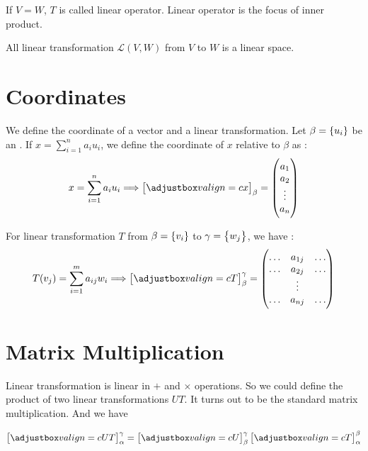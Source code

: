 If $V = W$, $T$ is called linear operator. Linear operator is the focus of inner product.

All linear transformation $\mathcal {L}(V,W)$ from $V$ to $W$ is a linear space.

\section{Coordinates}

We define the coordinate of a vector and a linear transformation. Let $\beta = \set{u_i}$ be an . If $x = \sum_{i=1}^n a_i u_i$, we define the coordinate of $x$ relative to $\beta$ as :
\begin{equation}
    x = \sum_{i=1}^n a_i u_i \Longrightarrow \coordinate{x}_\beta = \begin{pmatrix}
        a_1 \\
        a_2 \\
        \vdots \\
        a_n
    \end{pmatrix}
\end{equation}

For linear transformation $T$ from $\beta = \set{v_i} $ to $\gamma = \set{w_j}$, we have :
\begin{equation}
    T(v_j) = \sum_{i=1}^m a_{ij} w_i \Longrightarrow \coordinate{T}_{\beta}^{\gamma} = \begin{pmatrix}
        \hdots & a_{1j} & \hdots \\
        \hdots & a_{2j} & \hdots \\
        & \vdots \\
        \hdots & a_{nj} & \hdots \\
    \end{pmatrix}
\end{equation}



\section{Matrix Multiplication}

Linear transformation is linear in $+$ and $\times$ operations. So we could define the product of two linear transformations $UT$. It turns out to be the standard matrix multiplication. And we have

\begin{equation}\label{matrix_coordinate}
    \coordinate{UT}_{\alpha}^{\gamma} = \coordinate{U}_{\beta}^{\gamma} \coordinate{T}_{\alpha}^{\beta}
\end{equation}

